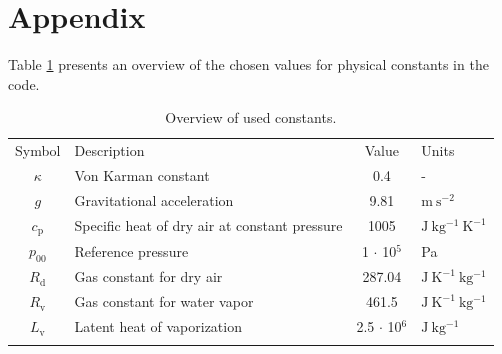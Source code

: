 \documentclass[gmd,manuscript]{copernicus}
\begin{document}
\appendix \section{Appendix}
Table \ref{tab:constants} presents an overview of the chosen values for physical constants in the code.
\begin{table}[t]
\caption{Overview of used constants.}\label{tab:constants}
\begin{tabular}{clcl}
\tophline
Symbol & Description & Value & Units \\
\middlehline
$\kappa$ & Von Karman constant & 0.4 & -\\
$g$ & Gravitational acceleration & 9.81 & $\mathrm{m~s^{-2}}$\\
$c_\mathrm{p}$ & Specific heat of dry air at constant pressure & 1005 & $\mathrm{J~kg^{-1}~K^{-1}}$\\
$p_\mathrm{00}$ & Reference pressure & 1 $\cdot$ 10$^5$ & Pa\\
$R_\mathrm{d}$ & Gas constant for dry air & 287.04 & $\mathrm{J~K^{-1}~kg^{-1}}$\\
$R_\mathrm{v}$ & Gas constant for water vapor & 461.5 & $\mathrm{J~K^{-1}~kg^{-1}}$\\
$L_\mathrm{v}$ & Latent heat of vaporization & 2.5 $\cdot$ 10$^6$ & $\mathrm{J~kg^{-1}}$\\
\bottomhline
\end{tabular}
\end{table}

\iffalse
\end{document}
